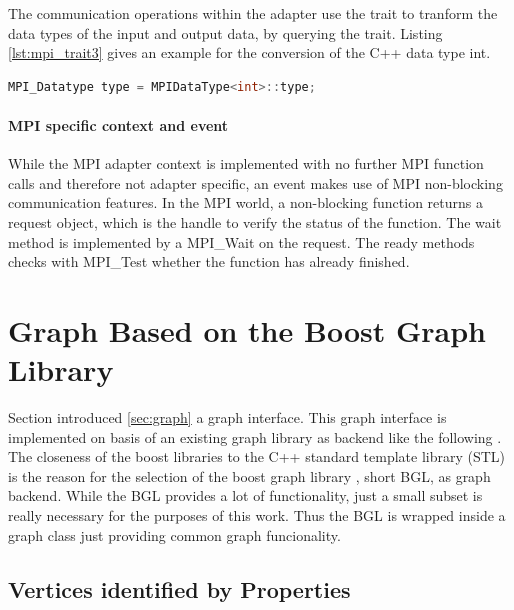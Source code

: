 The communication operations within the adapter use the trait to
tranform the data types of the input and output data, by querying the
trait. Listing \ref{lst:mpi_trait3} gives an example for the conversion 
of the C++ data type int.

\begin{lstlisting}[language=C++, label=lst:mpi_trait3]
  MPI_Datatype type = MPIDataType<int>::type;
\end{lstlisting}

\paragraph*{MPI specific context and event}
  
While the MPI adapter context is implemented with no further MPI
function calls and therefore not adapter specific, an event makes use
of MPI non-blocking communication features. In the MPI world, a
non-blocking function returns a request object, which is the handle to
verify the status of the function. The wait method is implemented by a
MPI\_Wait on the request. The ready methods checks with MPI\_Test
whether the function has already finished.

\section{Graph Based on the Boost Graph Library}

Section introduced \ref{sec:graph} a graph interface.  This graph
interface is implemented on basis of an existing graph library as
backend like the following
\cite{ref:lemon,ref:bgl,ref:igraph,ref:ogdf}.  The closeness of the
boost libraries to the C++ standard template library (STL) is the
reason for the selection of the boost graph library
\cite{ref:boost::bgl}, short BGL, as graph backend.  While the BGL
provides a lot of functionality, just a small subset is really
necessary for the purposes of this work. Thus the BGL is wrapped
inside a graph class just providing common graph funcionality.

\subsection{Vertices identified by Properties}

